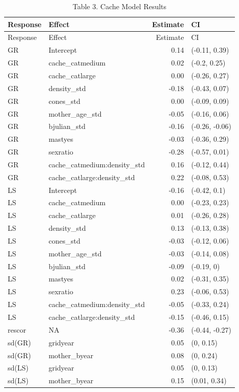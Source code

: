\documentclass[
]{article}
\begin{document}
\begin{longtable}[]{@{}llrl@{}}
\caption{Table 3. Cache Model Results}\tabularnewline
\toprule\noalign{}
Response & Effect & Estimate & CI \\
\midrule\noalign{}
\endfirsthead
\toprule\noalign{}
Response & Effect & Estimate & CI \\
\midrule\noalign{}
\endhead
\bottomrule\noalign{}
\endlastfoot
GR & Intercept & 0.14 & (-0.11, 0.39) \\
GR & cache\_catmedium & 0.02 & (-0.2, 0.25) \\
GR & cache\_catlarge & 0.00 & (-0.26, 0.27) \\
GR & density\_std & -0.18 & (-0.43, 0.07) \\
GR & cones\_std & 0.00 & (-0.09, 0.09) \\
GR & mother\_age\_std & -0.05 & (-0.16, 0.06) \\
GR & bjulian\_std & -0.16 & (-0.26, -0.06) \\
GR & mastyes & -0.03 & (-0.36, 0.29) \\
GR & sexratio & -0.28 & (-0.57, 0.01) \\
GR & cache\_catmedium:density\_std & 0.16 & (-0.12, 0.44) \\
GR & cache\_catlarge:density\_std & 0.22 & (-0.08, 0.53) \\
LS & Intercept & -0.16 & (-0.42, 0.1) \\
LS & cache\_catmedium & 0.00 & (-0.23, 0.23) \\
LS & cache\_catlarge & 0.01 & (-0.26, 0.28) \\
LS & density\_std & 0.13 & (-0.13, 0.38) \\
LS & cones\_std & -0.03 & (-0.12, 0.06) \\
LS & mother\_age\_std & -0.03 & (-0.14, 0.08) \\
LS & bjulian\_std & -0.09 & (-0.19, 0) \\
LS & mastyes & 0.02 & (-0.31, 0.35) \\
LS & sexratio & 0.23 & (-0.06, 0.53) \\
LS & cache\_catmedium:density\_std & -0.05 & (-0.33, 0.24) \\
LS & cache\_catlarge:density\_std & -0.15 & (-0.46, 0.15) \\
rescor & NA & -0.36 & (-0.44, -0.27) \\
sd(GR) & gridyear & 0.05 & (0, 0.15) \\
sd(GR) & mother\_byear & 0.08 & (0, 0.24) \\
sd(LS) & gridyear & 0.05 & (0, 0.13) \\
sd(LS) & mother\_byear & 0.15 & (0.01, 0.34) \\
\end{longtable}
\end{document}
